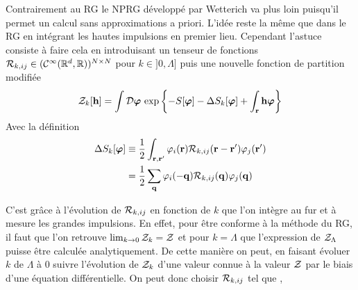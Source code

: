 \documentclass[10pt]{article}
\begin{document}
\begin{multicols}{2}
Contrairement au RG le NPRG développé par Wetterich \cite{wetterich} va plus loin puisqu'il permet un calcul sans approximations a priori. L'idée reste la même que dans le RG en intégrant les hautes impulsions en  premier lieu. Cependant l'astuce consiste à faire cela en introduisant un tenseur de fonctions $\mathcal{R}_{k, ij} \in (\mathcal{C}^\infty(\mathbb{R}^{d},\mathbb{R}))^{N\times N}$ pour $k \in ]0, \Lambda]$ puis une nouvelle fonction de partition modifiée  
\begin{equation}
  \mathcal{Z}_k[{\bf h}] = \int \mathcal{D} \boldsymbol{ \varphi} \, \exp\left\{-S[\boldsymbol{ \varphi}] - \Delta S_k[\boldsymbol{ \varphi}] + \int_{{\bf r}} {\bf h} \boldsymbol{ \varphi} \right\} 
\end{equation}
Avec la définition
\begin{equation}
  \begin{split}
  \Delta S_k[\boldsymbol{ \varphi}]  & \equiv \frac{1}{2} \int_{{\bf r}, {\bf r}'} \varphi_i({\bf r}) \mathcal{R}_{k,ij}({\bf r} - {\bf r}') \varphi_j({\bf r}') \\
 & =  \frac{1}{2} \sum_{{\bf q}} \varphi_i(-{\bf q}) \mathcal{R}_{k,ij}({\bf q}) \varphi_j({\bf q})
\end{split}
\end{equation}


C'est grâce à l'évolution de $\mathcal{R}_{k,ij}$ en fonction de $k$ que l'on intègre au fur et à mesure les grandes impulsions. En effet, pour être conforme à la méthode du RG, il faut que l'on retrouve $\lim_{k \to 0}\mathcal{Z}_k = \mathcal{Z}$ et pour $k = \Lambda$ que l'expression de $\mathcal{Z}_\Lambda$ puisse être calculée analytiquement. De cette manière on peut, en faisant évoluer $k$ de $\Lambda$ à $0$ suivre l'évolution de $\mathcal{Z}_k$ d'une valeur connue à la valeur $\mathcal{Z}$ par le biais d'une équation différentielle. On peut donc choisir $\mathcal{R}_{k,ij}$ tel que , \\


\end{multicols}
\end{document}
